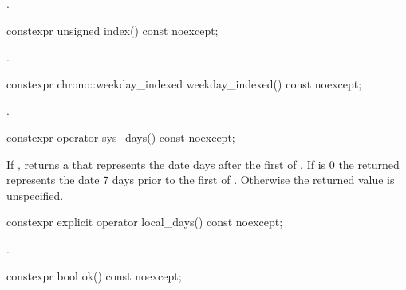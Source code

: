 \begin{itemdescr}
\pnum
\returns
{}.
\end{itemdescr}

%
\begin{itemdecl}
constexpr unsigned index() const noexcept;
\end{itemdecl}

\begin{itemdescr}
\pnum
\returns
{}.
\end{itemdescr}

%
\begin{itemdecl}
constexpr chrono::weekday_indexed weekday_indexed() const noexcept;
\end{itemdecl}

\begin{itemdescr}
\pnum
\returns
{}.
\end{itemdescr}

%
\begin{itemdecl}
constexpr operator sys_days() const noexcept;
\end{itemdecl}

\begin{itemdescr}
\pnum
\returns
If ,
returns a  that
represents the date  days after
the first  of .
If  is 0
the returned 
represents the date 7 days prior to
the first  of .
Otherwise the returned value is unspecified.
\end{itemdescr}

%
\begin{itemdecl}
constexpr explicit operator local_days() const noexcept;
\end{itemdecl}

\begin{itemdescr}
\pnum
\returns
{}.
\end{itemdescr}

%
\begin{itemdecl}
constexpr bool ok() const noexcept;
\end{itemdecl}

